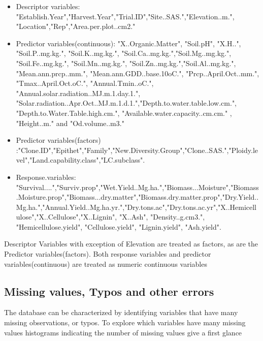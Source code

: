 \documentclass{article}\usepackage[]{graphicx}\usepackage[]{color}
\begin{document}
\begin{itemize}
  \item
  Descriptor variables: "Establish.Year","Harvest.Year","Trial.ID","Site..SAS.","Elevation..m.", "Location","Rep","Area.per.plot..cm2."
  
  \item
  Predictor variables(continuous): "X..Organic.Matter", "Soil.pH", "X.H..", "Soil.P..mg.kg.", "Soil.K..mg.kg.", "Soil.Ca..mg.kg.","Soil.Mg..mg.kg.", "Soil.Fe..mg.kg.", "Soil.Mn..mg.kg.", "Soil.Zn..mg.kg.","Soil.Al..mg.kg.", "Mean.ann.prcp..mm.", "Mean.ann.GDD..base.10oC.", "Prcp..April.Oct..mm.", "Tmax..April.Oct.oC.", "Annual.Tmin..oC.", "Annual.solar.radiation..MJ.m.1.day.1.", "Solar.radiation..Apr.Oct..MJ.m.1.d.1.","Depth.to.water.table.low.cm.", "Depth.to.Water.Table.high.cm.", "Available.water.capacity..cm.cm." , "Height..m." and "Od.volume..m3."
  
  \item
  Predictor variables(factors) :"Clone.ID","Epithet","Family","New.Diversity.Group","Clone..SAS.","Ploidy.level","Land.capability.class","LC.subclass".
  
  \item
  Response.variables: "Survival....","Surviv.prop","Wet.Yield..Mg.ha.","Biomass...Moisture","Biomass.Moisture.prop","Biomass...dry.matter","Biomass.dry.matter.prop","Dry.Yield..Mg.ha.","Annual.Yield..Mg.ha.yr.","Dry.tons.ac","Dry.tons.ac.yr","X..Hemicellulose","X..Cellulose","X..Lignin", "X..Ash", "Density..g.cm3.", "Hemicellulose.yield", "Cellulose.yield", "Lignin.yield", "Ash.yield".
  
\end{itemize}

Descriptor Variables with exception of Elevation are treated as factors, as are the Predictor variables(factors). Both response variables and predictor variables(continuous) are treated as numeric continuous variables

\subsection*{Missing values, Typos and other errors}

The database can be characterized by identifying variables that have many missing observations, or typos. To explore which variables have many missing values histograms indicating the number of missing values give a first glance
\end{document}
